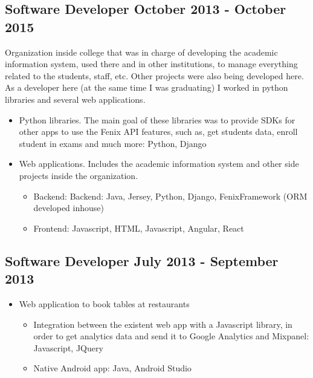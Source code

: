 \subsection{{Software Developer \hfill October 2013 - October 2015}}
\begin{zitemize}
\item Organization inside college that was in charge of developing 
the academic information system, 
used there and in other institutions, to manage everything
related to the students, staff, etc. 
Other projects were also being developed here. 
As a developer here (at the same time I was graduating) 
I worked in python libraries and several web applications.
\begin{itemize}
    \item Python libraries. The main goal of these libraries was to provide
    SDKs for other apps to use the Fenix API features, such as, get
    students data, enroll student in exams and much more: Python, Django
    \item Web applications. Includes the academic information system
    and other side projects inside the organization.
    \begin{itemize}
        \item Backend: Backend: Java, Jersey, Python, Django, FenixFramework (ORM developed inhouse)
        \item Frontend: Javascript, HTML, Javascript, Angular, React
    \end{itemize}
\end{itemize}
\end{zitemize}

\subsection{{Software Developer \hfill July 2013 - September 2013}}
\begin{itemize}
\item Web application to book tables at restaurants
\begin{itemize}
    \item Integration between the existent web app with a Javascript library, 
    in order to get analytics data and send it to Google Analytics and Mixpanel: 
    Javascript, JQuery
    \item Native Android app: Java, Android Studio
\end{itemize}
\end{itemize}
